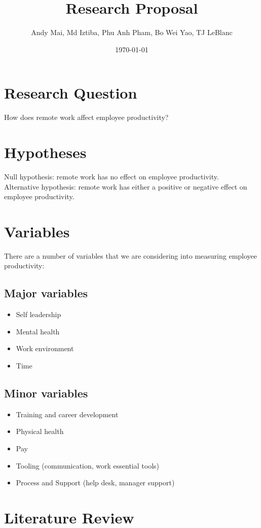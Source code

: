 \documentclass[12pt]{article}
\title{Research Proposal}
\author{Andy Mai, Md Iztiba, Phu Anh Pham, Bo Wei Yao, TJ LeBlanc}
\date{\today}
\begin{document}
\maketitle

\section*{Research Question}
How does remote work affect employee productivity?

\section*{Hypotheses}
Null hypothesis: remote work has no effect on employee productivity. \\
Alternative hypothesis: remote work has either a positive or negative effect on employee productivity. 

\section*{Variables}
There are a number of variables that we are considering into measuring employee productivity: 

\subsection*{Major variables}
\begin{itemize}
  \item Self leadership 
  \item Mental health 
  \item Work environment 
  \item Time
\end{itemize}

\subsection*{Minor variables}
\begin{itemize}
  \item Training and career development 
  \item Physical health 
  \item Pay
  \item Tooling (communication, work essential tools)
  \item Process and Support (help desk, manager support)
\end{itemize}


\section*{Literature Review}
\end{document}
